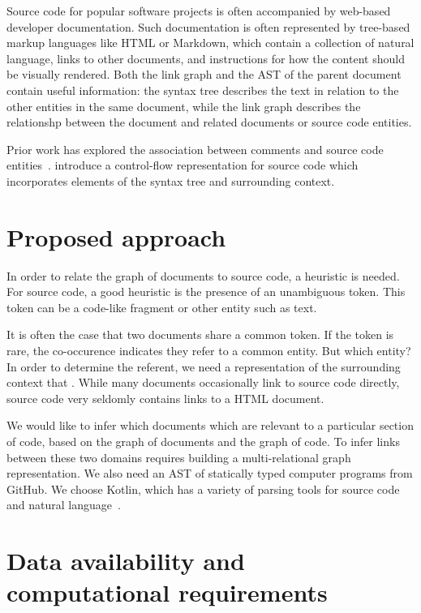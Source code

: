 \documentclass{article}
\begin{document}
Source code for popular software projects is often accompanied by web-based developer documentation. Such documentation is often represented by tree-based markup languages like HTML or Markdown, which contain a collection of natural language, links to other documents, and instructions for how the content should be visually rendered. Both the link graph and the AST of the parent document contain useful information: the syntax tree describes the text in relation to the other entities in the same document, while the link graph describes the relationshp between the document and related documents or source code entities.

Prior work has explored the association between comments and source code entities~\citep{panthaplackel2020associating}. \citet{si2018learning} introduce a control-flow representation for source code which incorporates elements of the syntax tree and surrounding context.

\section{Proposed approach}

In order to relate the graph of documents to source code, a heuristic is needed. For source code, a good heuristic is the presence of an unambiguous token. This token can be a code-like fragment or other entity such as text.

It is often the case that two documents share a common token. If the token is rare, the co-occurence indicates they refer to a common entity. But which entity? In order to determine the referent, we need a representation of the surrounding context that . While many documents occasionally link to source code directly, source code very seldomly contains links to a HTML document.

We would like to infer which documents which are relevant to a particular section of code, based on the graph of documents and the graph of code. To infer links between these two domains requires building a multi-relational graph representation. We also need an AST of statically typed computer programs from GitHub. We choose Kotlin, which has a variety of parsing tools for source code~\citep{kovalenko2019pathminer} and natural language~\citep{grella2018non}.

\section{Data availability and computational requirements}



\end{document}
